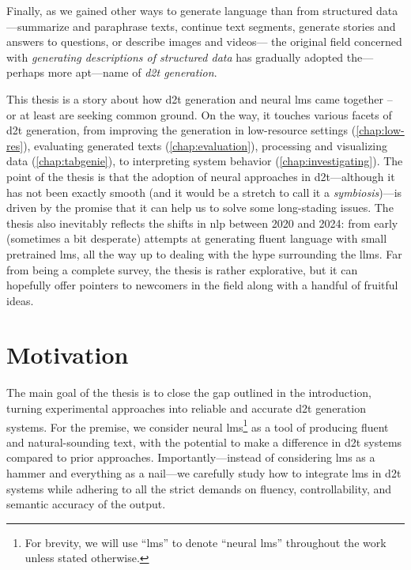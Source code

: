 Finally, as we gained other ways to generate language than from structured data---summarize and paraphrase texts, continue text segments, generate stories and answers to questions, or describe images and videos---%
the original field concerned with \textit{generating descriptions of structured data} has gradually adopted the---perhaps more apt---name of \emph{\ac{d2t} generation}.

This thesis is a story about how \acl{d2t} generation and neural \aclp{lm} came together -- or at least are seeking common ground. On the way, it touches various facets of \ac{d2t} generation, from improving the generation in low-resource settings (\autoref{chap:low-res}), evaluating generated texts (\autoref{chap:evaluation}), processing and visualizing data (\autoref{chap:tabgenie}), to interpreting system behavior (\autoref{chap:investigating}). The point of the thesis is that the adoption of neural approaches in \ac{d2t}---although it has not been exactly smooth (and it would be a stretch to call it a \emph{symbiosis})---is driven by the promise that it can help us to solve some long-stading issues. The thesis also inevitably reflects the shifts in \ac{nlp} between 2020 and 2024: from early (sometimes a bit desperate) attempts at generating fluent language with small pretrained \acp{lm}, all the way up to dealing with the hype surrounding the \acp{llm}.  Far from being a complete survey, the thesis is rather explorative, but it can hopefully offer pointers to newcomers in the field along with a handful of fruitful ideas.










\section{Motivation}
\label{sec:rq}

The main goal of the thesis is to close the gap outlined in the introduction, turning experimental approaches into reliable and accurate \ac{d2t} generation systems. For the premise, we consider neural \acp{lm}\footnote{For brevity, we will use ``\acp{lm}'' to denote ``neural \acp{lm}'' throughout the work unless stated otherwise.} as a tool of producing fluent and natural-sounding text, with the potential to make a difference in \ac{d2t} systems compared to prior approaches. Importantly---instead of considering \acp{lm} as a hammer and everything as a nail---we carefully study how to integrate \acp{lm} in \ac{d2t} systems while adhering to all the strict demands on fluency, controllability, and semantic accuracy of the output.

